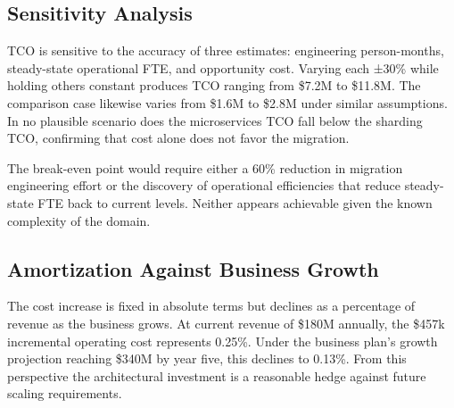 \subsection{Sensitivity Analysis}

TCO is sensitive to the accuracy of three estimates: engineering person-months, steady-state operational FTE, and opportunity cost. Varying each ±30\% while holding others constant produces TCO ranging from \$7.2M to \$11.8M. The comparison case likewise varies from \$1.6M to \$2.8M under similar assumptions. In no plausible scenario does the microservices TCO fall below the sharding TCO, confirming that cost alone does not favor the migration.

The break-even point would require either a 60\% reduction in migration engineering effort or the discovery of operational efficiencies that reduce steady-state FTE back to current levels. Neither appears achievable given the known complexity of the domain.

\subsection{Amortization Against Business Growth}

The cost increase is fixed in absolute terms but declines as a percentage of revenue as the business grows. At current revenue of \$180M annually, the \$457k incremental operating cost represents 0.25\%. Under the business plan's growth projection reaching \$340M by year five, this declines to 0.13\%. From this perspective the architectural investment is a reasonable hedge against future scaling requirements.
